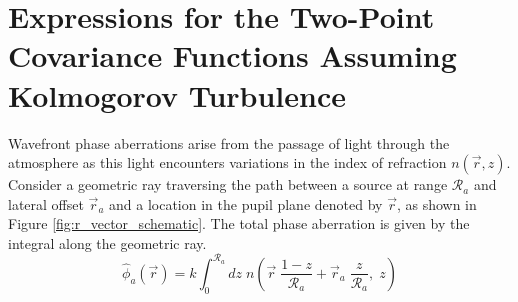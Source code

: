 \appendix
\renewcommand{\thesection}{\Alph{section}}

\section{Expressions for the Two-Point Covariance Functions Assuming Kolmogorov Turbulence}
\label{app:kolmogorov_deriv}

Wavefront phase aberrations arise from the passage of light through
the atmosphere as this light encounters variations in the index of
refraction $n\left(\vec{r},z\right)$.  Consider a geometric ray
traversing the path between a source at range $\mathcal{R}_{a}$ and
lateral offset $\vec{r}_{a}$ and a location in the pupil plane
denoted by $\vec{r}$, as shown in Figure
\ref{fig:r_vector_schematic}.  The total phase aberration is given by the integral
along the geometric ray.
\begin{equation}\label{eqn:totalphase_n}
\hat{\phi}_{a}\left(\vec{r}\right) = k \int_{0}^{\mathcal{R}_{a}} dz \; 
n\left(\vec{r} \; \frac{1-z}{\mathcal{R}_{a}} + \vec{r}_{a} \;
  \frac{z}{\mathcal{R}_{a}}, \;z\right)
\end{equation}
